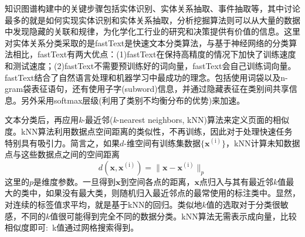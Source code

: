 
%
%
%
%
%
知识图谱构建中的关键步骤包括实体识别、实体关系抽取、事件抽取等，其中讨论最多的就是如何实现实体识别和实体关系抽取，分析挖掘算法则可以从大量的数据中发现隐藏的关联和规律，为化学化工行业的研究和决策提供有价值的信息。这里对实体关系分类采取的是\textrm{fastText}是快速文本分类算法，与基于神经网络的分类算法相比，\textrm{fastText}有两大优点：(1)\textrm{fastText}在保持高精度的情况下加快了训练速度和测试速度；(2)\textrm{fastText}不需要预训练好的词向量，\textrm{fastText}会自己训练词向量。
\textrm{fastText}结合了自然语言处理和机器学习中最成功的理念。包括使用词袋以及\textrm{n-gram}袋表征语句，还有使用子字\textrm{(subword)}信息，并通过隐藏表征在类别间共享信息。另外采用\textrm{softmax}层级(利用了类别不均衡分布的优势)来加速。

文本分类后，再应用\textit{k}-最近邻(\textit{k}-\textrm{nearest neighbors, kNN})算法来定义页面的相似度。\textrm{kNN}算法利用数据点空间距离的类似性，不再训练，因此对于处理快速任务特别具有吸引力。简言之，如果$d$-维空间有训练集数据$\{\mathbf{x}^{(\mathrm{i})}\}$，\textrm{kNN}计算未知数据点与这些数据点之间的空间距离
\begin{displaymath}
	d(\mathbf{x},\mathbf{x}^{(\mathrm{i})})=\|\mathbf{x}-\mathbf{x}^{(\mathrm{i})}\|_p
\end{displaymath}
这里的$p$是维度参数。一旦得到$\mathbf{x}$到空间各点的距离，$\mathbf{x}$点归入与其有最近邻$k$值最大的类中，如果没有最大类，则随机归入最近邻点的最常使用的标注类中。显然，对连续的标签值求平均，就是基于\textrm{kNN}的回归。类似地$k$值的选取对于分类很敏感，不同的$k$值很可能得到完全不同的数据分类。\textrm{kNN}算法无需表示成向量，比较相似度即可:~\textrm{k}值通过网格搜索得到。

